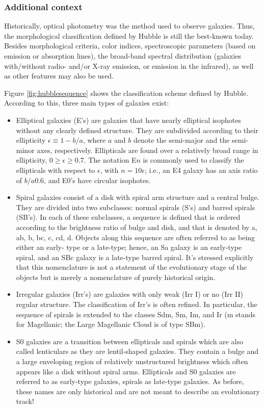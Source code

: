 \documentclass[a4paper,11pt]{article}
\begin{document}
\subsubsection{Additional context}

Historically, optical photometry was the method used to observe galaxies. Thus, the morphological classification defined by Hubble is still the best-known today. Besides morphological criteria, color indices, spectroscopic parameters (based on emission or absorption lines), the broad-band spectral distribution (galaxies with/without radio- and/or X-ray emission, or emission in the infrared), as well as other features may also be used.

{\noindent}Figure \ref{fig:hubblesequence} shows the classification scheme defined by Hubble. According to this, three main types of galaxies exist:

\begin{itemize}
    \item Elliptical galaxies (E's) are galaxies that have nearly elliptical isophotes without any clearly defined structure. They are subdivided according to their ellipticity $\epsilon\equiv1-b/a$, where $a$ and $b$ denote the semi-major and the semi-minor axes, respectively. Ellipticals are found over a relatively broad range in ellipticity, $0\geq\epsilon\geq0.7$. The notation E$n$ is commonly used to classify the ellipticals with respect to $\epsilon$, with $n=10\epsilon$; i.e., an E4 galaxy has an axis ratio of $b/a0.6$, and E0's have circular isophotes.
    \item Spiral galaxies consist of a disk with spiral arm structure and a central bulge. They are divided into two subclasses: normal spirals (S's) and barred spirals (SB's). In each of these subclasses, a sequence is defined that is ordered according to the brightness ratio of bulge and disk, and that is denoted by a, ab, b, bc, c, cd, d. Objects along this sequence are often referred to as being either an early- type or a late-type; hence, an Sa galaxy is an early-type spiral, and an SBc galaxy is a late-type barred spiral. It's stressed explicitly that this nomenclature is not a statement of the evolutionary stage of the objects but is merely a nomenclature of purely historical origin.
    \item Irregular galaxies (Irr’s) are galaxies with only weak (Irr I) or no (Irr II) regular structure. The classification of Irr's is often refined. In particular, the sequence of spirals is extended to the classes Sdm, Sm, Im, and Ir (m stands for Magellanic; the Large Magellanic Cloud is of type SBm).
    \item S0 galaxies are a transition between ellipticals and spirals which are also called lenticulars as they are lentil-shaped galaxies. They contain a bulge and a large enveloping region of relatively unstructured brightness which often appears like a disk without spiral arms. Ellipticals and S0 galaxies are referred to as early-type galaxies, spirals as late-type galaxies. As before, these names are only historical and are not meant to describe an evolutionary track!
\end{itemize}
\end{document}
